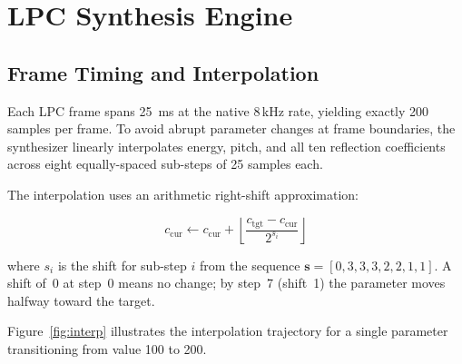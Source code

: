 \documentclass[10pt]{article}
\begin{document}
\section{LPC Synthesis Engine}
\label{sec:synth}

\subsection{Frame Timing and Interpolation}

Each LPC frame spans 25~ms at the native 8\,kHz rate, yielding exactly 200
samples per frame.  To avoid abrupt parameter changes at frame boundaries, the
synthesizer linearly interpolates energy, pitch, and all ten reflection
coefficients across eight equally-spaced sub-steps of 25 samples each.

The interpolation uses an arithmetic right-shift approximation:

\begin{equation}
c_{\mathrm{cur}} \leftarrow c_{\mathrm{cur}} +
  \left\lfloor \frac{c_{\mathrm{tgt}} - c_{\mathrm{cur}}}{2^{s_i}}
  \right\rfloor
\label{eq:interp}
\end{equation}

where $s_i$ is the shift for sub-step $i$ from the sequence
$\mathbf{s} = [0, 3, 3, 3, 2, 2, 1, 1]$.  A shift of~0 at step~0 means no
change; by step~7 (shift~1) the parameter moves halfway toward the target.

Figure~\ref{fig:interp} illustrates the interpolation trajectory for a single
parameter transitioning from value 100 to 200.
\end{document}
